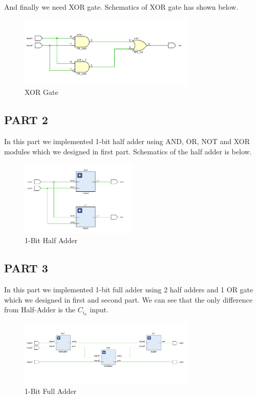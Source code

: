 \documentclass[pdftex,12pt,a4paper]{article}
\begin{document}
And finally we need XOR gate. Schematics of XOR gate has shown below.

\begin{figure}[H]
    \centering
    \includegraphics[width=0.75\textwidth]{xor_gate_vivado.png}
    \caption{XOR Gate}
\end{figure}

\subsection{PART 2}

In this part we implemented 1-bit half adder using AND, OR, NOT and XOR modules which we designed in first part. Schematics of the half adder is below. 
\begin{figure}[H]
    \centering
    \includegraphics[width=0.5\textwidth]{halfadder_vivado.png}
    \caption{1-Bit Half Adder}
\end{figure}

\subsection{PART 3}

In this part we implemented 1-bit full adder using 2 half adders and 1 OR gate which we designed in first and second part. We can see that the only difference from Half-Adder is the $C_i_n$ input.

\begin{figure}[H]
    \centering
    \includegraphics[width=0.75\textwidth]{fulladder_vivado.png}
    \caption{1-Bit Full Adder}
\end{figure}
\end{document}
